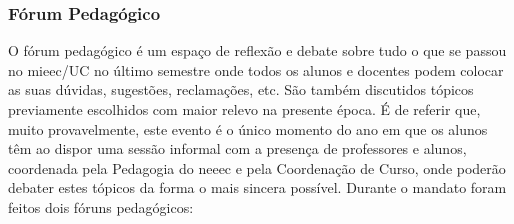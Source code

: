 
\subsubsection{Fórum Pedagógico}

O fórum pedagógico é um espaço de reflexão e debate sobre tudo o que se passou no \acrshort{mieec}/UC no último semestre onde todos os alunos e docentes podem colocar as suas dúvidas, sugestões, reclamações, etc. São também discutidos tópicos previamente escolhidos com maior relevo na presente época. É de referir que, muito provavelmente, este evento é o único momento do ano em que os alunos têm ao dispor uma sessão informal com a presença de professores e alunos, coordenada pela Pedagogia do \acrshort{neeec} e pela Coordenação de Curso, onde poderão debater estes tópicos da forma o mais sincera possível.
Durante o mandato foram feitos dois fóruns pedagógicos:
